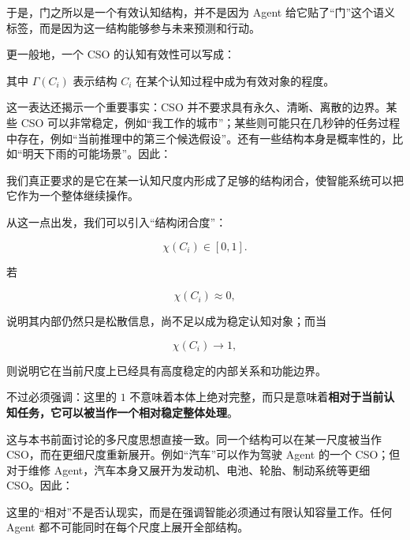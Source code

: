 于是，门之所以是一个有效认知结构，并不是因为 Agent 给它贴了“门”这个语义标签，而是因为这一结构能够参与未来预测和行动。

更一般地，一个 CSO 的认知有效性可以写成：

\begin{statementbox}
\centering
{}
\end{statementbox}

其中 \(\Gamma(C_i)\) 表示结构 \(C_i\) 在某个认知过程中成为有效对象的程度。

这一表达还揭示一个重要事实：CSO 并不要求具有永久、清晰、离散的边界。某些 CSO 可以非常稳定，例如“我工作的城市”；某些则可能只在几秒钟的任务过程中存在，例如“当前推理中的第三个候选假设”。还有一些结构本身是概率性的，比如“明天下雨的可能场景”。因此：

\begin{statementbox}
\centering
{}
\end{statementbox}

我们真正要求的是它在某一认知尺度内形成了足够的结构闭合，使智能系统可以把它作为一个整体继续操作。

从这一点出发，我们可以引入“结构闭合度”：

\[
\chi(C_i)
\in[0,1].
\]

若

\[
\chi(C_i)\approx 0,
\]

说明其内部仍然只是松散信息，尚不足以成为稳定认知对象；而当

\[
\chi(C_i)\rightarrow 1,
\]

则说明它在当前尺度上已经具有高度稳定的内部关系和功能边界。

不过必须强调：这里的 \(1\) 不意味着本体上绝对完整，而只是意味着\textbf{相对于当前认知任务，它可以被当作一个相对稳定整体处理}。

这与本书前面讨论的多尺度思想直接一致。同一个结构可以在某一尺度被当作 CSO，而在更细尺度重新展开。例如“汽车”可以作为驾驶 Agent 的一个 CSO；但对于维修 Agent，汽车本身又展开为发动机、电池、轮胎、制动系统等更细 CSO。因此：

\begin{statementbox}
\centering
{}
\end{statementbox}

这里的“相对”不是否认现实，而是在强调智能必须通过有限认知容量工作。任何 Agent 都不可能同时在每个尺度上展开全部结构。

